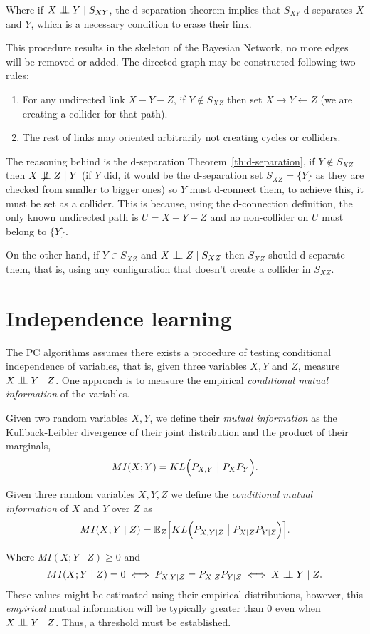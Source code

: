 Where if \(X \bigCI Y \mid S_{XY}\), the d-separation theorem implies that \(S_{XY}\) d-separates \(X\) and \(Y\), which is a necessary condition to erase their link.

This procedure results in the skeleton of the Bayesian Network, no more edges will be removed or added. The directed graph may be constructed following two rules:
\begin{enumerate}
  \item For any undirected link \(X - Y - Z\), if \(Y \notin S_{XZ}\) then set
    \(X \to Y \leftarrow Z\) (we are creating a collider for that path).
  \item The rest of links may oriented arbitrarily not
creating cycles or colliders.
\end{enumerate}
The reasoning behind is the d-separation Theorem~\ref{th:d-separation},  if \(Y \notin S_{XZ}\) then \(X \bigCD Z \mid Y\) (if \(Y\) did, it would be the d-separation set \(S_{XZ} = \{Y\}\) as they are checked from smaller to bigger ones) so \(Y\) must d-connect them, to achieve this, it must be set as a collider. This is because, using the d-connection definition, the only known undirected path is \(U = X - Y - Z\) and no non-collider on \(U\) must belong to \(\{Y\}\).


On the other hand, if \(Y \in S_{XZ}\) and \(X \bigCI Z \mid S_{XZ}\) then \(S_{XZ}\) should d-separate them, that is, using any configuration that doesn't create a collider in \(S_{XZ}\).

\section{Independence learning}

The PC algorithms assumes there exists a procedure of testing conditional independence of variables, that is, given three variables \(X, Y\) and \( Z \),  measure \(X \bigCI Y \mid Z\). One approach is to measure the empirical \emph{conditional mutual information} of the variables.

\begin{definition}
  Given two random variables \(X, Y\), we define their \emph{mutual information} as the Kullback-Leibler divergence of their joint distribution and the product of their marginals,
  \[
    MI(X;Y) = KL\Big(P_{X,Y} \bigm| P_{X}P_{Y}\Big).
  \]
\end{definition}

\begin{definition}
  Given three random variables \(X, Y, Z\) we define the \emph{conditional mutual information} of \(X\) and \(Y\) over \(Z\) as
  \[
    MI(X;Y\mid Z) = \mathbb{E}_{Z}\Big[KL\Big(P_{X,Y \mid Z} \bigm| P_{X\mid Z} P_{Y \mid Z}\Big)\Big].
  \]
\end{definition}
Where \(MI(X;Y \mid Z) \geq 0\) and
\[
MI(X;Y \mid Z) = 0 \iff P_{X,Y \mid Z} = P_{X\mid Z} P_{Y \mid Z} \iff X\bigCI Y \mid Z.
\]
These values might be estimated using their empirical distributions, however, this \emph{empirical} mutual information will be typically greater than \(0\) even when \(X\bigCI Y \mid Z\). Thus, a threshold must be established.

